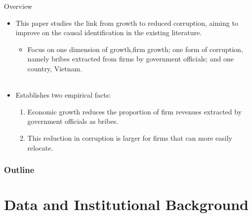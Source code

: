 \documentclass{beamer}
\begin{document}
\begin{frame}{Overview}
\begin{itemize}
\item This paper studies the link from growth to reduced corruption, aiming to improve on the causal identification in the existing literature.

\begin{itemize}
\item Focus on one dimension of growth,firm growth; one form of corruption, namely bribes extracted from
firms by government officials; and one country, Vietnam. \\~
\end{itemize}

\item Establishes two empirical facts:
\begin{enumerate}
\item Economic growth reduces the proportion of firm revenues extracted by government officials as bribes.
\item This reduction in corruption is larger for firms that can more easily relocate.
\end{enumerate}

\end{itemize}

\end{frame}

\begin{frame}

\frametitle{Outline}
\tableofcontents

\end{frame}

\section{Data and Institutional Background}
\end{document}
